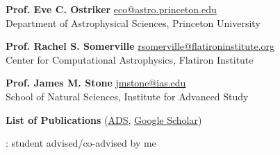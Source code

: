 \documentclass[12pt]{article}
\begin{document}

{\small {\bf Prof. Eve C. Ostriker}
\url{eco@astro.princeton.edu}\\
Department of Astrophysical Sciences, Princeton University}


{\small {\bf Prof. Rachel S. Somerville}
\url{rsomerville@flatironinstitute.org}\\
Center for Computational Astrophysics, Flatiron Institute}


{\small {\bf Prof. James M. Stone}
\url{jmstone@ias.edu}\\
School of Natural Sciences, Institute for Advanced Study}


\newpage
\begin{center}
{\large \bf List of Publications}
(\href{\adsurl}{ADS}, \href{\googleurl}{Google Scholar})\\

\end{center}



\begin{itemize}[itemsep=0pt,topsep=\parskip]
\small 
\end{itemize}





\begin{itemize}[itemsep=0pt,topsep=\parskip]
\small 
\end{itemize}




{: student advised/co-advised by me}
\begin{itemize}[itemsep=0pt,topsep=\parskip]
\small 
\end{itemize}
\end{document}
